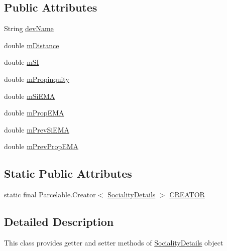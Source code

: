 \subsection*{Public Attributes}
\begin{DoxyCompactItemize}
\item 
String \hyperlink{classcs_1_1usense_1_1inference_module_1_1_sociality_details_ae31fcda774a26e9eaa301d1c849c862e}{dev\+Name}
\item 
double \hyperlink{classcs_1_1usense_1_1inference_module_1_1_sociality_details_a8fc3a7f6a0a00f2023f9587cdbe1d109}{m\+Distance}
\item 
double \hyperlink{classcs_1_1usense_1_1inference_module_1_1_sociality_details_a6fe385a5a4ec1863bc015a2e7a519289}{m\+S\+I}
\item 
double \hyperlink{classcs_1_1usense_1_1inference_module_1_1_sociality_details_af5fa1a890198a03f5618b1df1d8747c4}{m\+Propinquity}
\item 
double \hyperlink{classcs_1_1usense_1_1inference_module_1_1_sociality_details_a8752c40343750b4386076a200accfb45}{m\+Si\+E\+M\+A}
\item 
double \hyperlink{classcs_1_1usense_1_1inference_module_1_1_sociality_details_ad093550a5875409e710d94a2e9c32011}{m\+Prop\+E\+M\+A}
\item 
double \hyperlink{classcs_1_1usense_1_1inference_module_1_1_sociality_details_a28f866785375e83e1b1a917f40299fac}{m\+Prev\+Si\+E\+M\+A}
\item 
double \hyperlink{classcs_1_1usense_1_1inference_module_1_1_sociality_details_a40f01a69da27931a3c271a948d99d452}{m\+Prev\+Prop\+E\+M\+A}
\end{DoxyCompactItemize}
\subsection*{Static Public Attributes}
\begin{DoxyCompactItemize}
\item 
static final Parcelable.\+Creator$<$ \hyperlink{classcs_1_1usense_1_1inference_module_1_1_sociality_details}{Sociality\+Details} $>$ \hyperlink{classcs_1_1usense_1_1inference_module_1_1_sociality_details_aa5122152a10a67e49ec6c72c43aad81e}{C\+R\+E\+A\+T\+O\+R}
\end{DoxyCompactItemize}


\subsection{Detailed Description}
This class provides getter and setter methods of \hyperlink{classcs_1_1usense_1_1inference_module_1_1_sociality_details}{Sociality\+Details} object 

